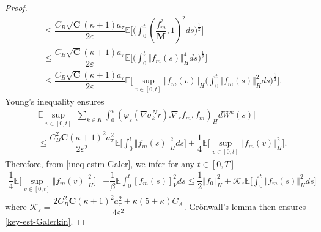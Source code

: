 \documentclass[10pt,a4paper]{amsart}
\newcommand{\E}{\ensuremath{\mathbb{E}}}
\begin{document}
\begin{proof}
\begin{align*}
  &\leq  \dfrac{C_B\sqrt{\mathbf{C}}(\kappa+1) a_\tau}{2\varepsilon}\E\Big[(\int_0^t(\dfrac{f_m^2}{\mathbf{M}}, 1)^2 ds\big)^{\frac{1}{2}} \Big] \\ 
  &\leq \dfrac{C_B\sqrt{\mathbf{C}}(\kappa+1) a_\tau}{2\varepsilon}\E\Big[(\int_0^t\Vert f_m(s)\Vert_H^4 ds\big)^{\frac{1}{2}} \Big]\\
  &\leq  \dfrac{C_B\sqrt{\mathbf{C}}(\kappa+1) a_\tau}{2\varepsilon}\E\Big[\sup_{v\in[0,t]} \Vert f_m(v)\Vert_H (\int_0^t\Vert f_m(s)\Vert_H^2 ds\big)^{\frac{1}{2}} \Big].
\end{align*} 
Young's inequality ensures
\begin{align*}
     &\E \sup_{v\in[0,t]}   \vert \sum_{k\in K}\int_0^v(\varphi_\varepsilon(\nabla \sigma_k^Nr).\nabla_rf_m ,f_m)_H dW^k(s)\vert \\&\leq  \dfrac{C_B^2\mathbf{C}(\kappa+1)^2 a_\tau^2}{2\varepsilon^2}\E\Big[ \int_0^t\Vert f_m(s)\Vert_H^2 ds \Big]+ \dfrac{1}{4}\E\Big[\sup_{v\in[0,t]} \Vert f_m(v)\Vert_H^2  \Big].
\end{align*}
Therefore, from \eqref{ineq-estm-Galer}, we infer for any $t\in [0,T]$ \begin{align*}
 \dfrac{1}{4}\E\Big[\sup_{v\in[0,t]} \Vert f_m(v)\Vert_H^2  \Big]&+\dfrac{1}{\beta}\E\int_0^t [f_m(s)]_V^2ds\leq \dfrac{1}{2}\Vert f_{0}\Vert_H^2
 +\mathcal{K}_\varepsilon\E\Big[ \int_0^t\Vert f_m(s)\Vert_H^2 ds \Big]
\end{align*}
where $\mathcal{K}_\varepsilon=\dfrac{2C_B^2\mathbf{C}(\kappa+1)^2 a_\tau^2+\kappa (5+\kappa)C_A}{4\varepsilon^2}.$   Grönwall's lemma then ensures \eqref{key-est-Galerkin}. 
\end{proof}
\end{document}
